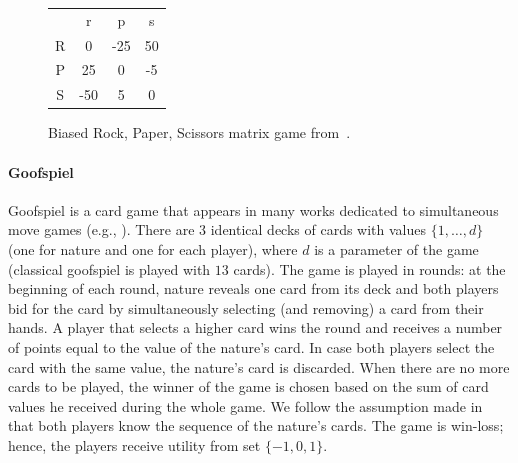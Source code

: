 \begin{figure}[h!]
\begin{center}
\begin{tabular}{c|c|c|c|}
 \multicolumn{1}{c}{~} & \multicolumn{1}{c}{r}  &  \multicolumn{1}{c}{p} &  \multicolumn{1}{c}{s}\\\cline{2-4}
R &  0  & -25& 50\\\cline{2-4}
P &  25 &  0 & -5\\\cline{2-4}
S & -50 &  5 &  0\\\cline{2-4}
\end{tabular}
\end{center}
\caption{Biased Rock, Paper, Scissors matrix game from~\cite{Shafiei09}. \label{fig:brps}}
\end{figure}

\paragraph{\textbf{Goofspiel}}
Goofspiel is a card game that appears in many works dedicated to simultaneous move games (e.g., \cite{Saffidine12SMAB,Rhoads12Computer,Lanctot13Goofspiel}). 
There are $3$ identical decks of cards with values $\{1,\dots, d\}$ (one for nature and one for each player), where $d$ is a parameter of the game (classical goofspiel is played with $13$ cards). 
The game is played in rounds: at the beginning of each round, nature reveals one card from its deck and both players bid for the card by simultaneously selecting (and removing) a card from their hands. 
A player that selects a higher card wins the round and receives a number of points equal to the value of the nature's card. In case both players select the card with the same value, the nature's card is discarded. 
When there are no more cards to be played, the winner of the game is chosen based on the sum of card values he received during the whole game. 
We follow the assumption made in \cite{Saffidine12SMAB} that both players know the sequence of the nature's cards. 
The game is win-loss; hence, the players receive utility from set $\lbrace -1, 0, 1 \rbrace$.


